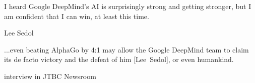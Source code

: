 \documentclass{beamer}
\begin{document}
  {
    \begin{frame}[standout]
      \epigraph{
        \tiny
        I heard Google DeepMind's AI is surprisingly strong and getting stronger, but I am confident that I can win, at least this time.
      }{Lee Sedol}
      \pause

      \epigraph{
        \tiny
        ...even beating AlphaGo by 4:1 may allow the Google DeepMind team to claim its de facto victory and the defeat of him [Lee~Sedol], or even humankind.
      }{interview in JTBC Newsroom}
      \pause
    \end{frame}
  }

  {
  }
\end{document}
